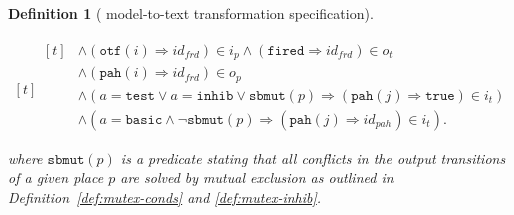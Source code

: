 \documentclass[pdflatex,sn-mathphys]{sn-jnl}%
\theoremstyle{thmstyleone}%
\theoremstyle{thmstyletwo}%
\theoremstyle{thmstylethree}%
\newtheorem{definition}{Definition}%
\begin{document}
\begin{definition}[\hilecop{} model-to-text transformation specification]
\begin{enumerate}[resume]
\begin{equation*}
\begin{aligned}[t]
\begin{aligned}[t]
                                      & \land(\mathtt{otf}(i)\Rightarrow{}id_{frd})\in{}i_p\land(\mathtt{fired}\Rightarrow{}id_{frd})\in{}o_t \\
                                      & \land(\mathtt{pah}(i)\Rightarrow{}id_{frd})\in{}o_p \\
                                      & \land(a=\mathtt{test}\lor{}a=\mathtt{inhib}\lor{}\mathtt{sbmut}(p)\Rightarrow(\mathtt{pah}(j)\Rightarrow\mathtt{true})\in{}i_t) \\
                                      & \land(a=\mathtt{basic}\land{}\lnot\mathtt{sbmut}(p)\Rightarrow(\mathtt{pah}(j)\Rightarrow{}id_{pah})\in{}i_t). \\
                    \end{aligned} \\
      \end{aligned}
    \end{equation*}
    where $\mathtt{sbmut}(p)$ is a predicate stating that all
    conflicts in the output transitions of a given place $p$ are
    solved by mutual exclusion as outlined in
    Definition~\ref{def:mutex-conds} and \ref{def:mutex-inhib}.

    

\end{enumerate}
\end{definition}
\end{document}
